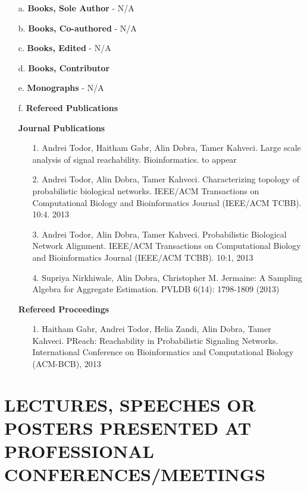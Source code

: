 \documentclass{article}
\begin{document}
\begin{enumerate}
  \renewcommand{\labelenumi}{\alph{enumi}}
  \item[a.] \textbf{Books, Sole Author} - N/A
  \item[b.] \textbf{Books, Co-authored} - N/A
  \item[c.] \textbf{Books, Edited} - N/A
  \item[d.] \textbf{Books, Contributor} 
  \item[e.] \textbf{Monographs} - N/A
  \item[f.] \textbf{Refereed Publications}
    
    \textbf{Journal Publications} 

    \begin{enumerate}
      \renewcommand{\labelenumi}{\arabic{enumii}}
      \item[1.] Andrei Todor, Haitham Gabr, Alin Dobra, Tamer Kahveci. Large scale analysis of signal reachability. Bioinformatics. to appear
      \item[2.] Andrei Todor, Alin Dobra, Tamer Kahveci. Characterizing topology of probabilistic biological networks. IEEE/ACM Transactions on Computational Biology and Bioinformatics Journal (IEEE/ACM TCBB). 10:4. 2013
      \item[3.] Andrei Todor,  Alin Dobra, Tamer Kahveci. Probabilistic Biological Network Alignment. IEEE/ACM Transactions on Computational Biology and Bioinformatics Journal (IEEE/ACM TCBB). 10:1, 2013
      \item[4.] Supriya Nirkhiwale, Alin Dobra, Christopher M. Jermaine: A Sampling Algebra for Aggregate Estimation. PVLDB 6(14): 1798-1809 (2013)
    \end{enumerate}

    \textbf{Refereed Proceedings}
    \begin{enumerate}
      \item[1.] Haitham Gabr, Andrei Todor, Helia Zandi, Alin Dobra, Tamer Kahveci. PReach: Reachability in Probabilistic Signaling Networks. International Conference on Bioinformatics and Computational Biology (ACM-BCB), 2013
    \end{enumerate}
\end{enumerate}

\section{LECTURES, SPEECHES OR POSTERS PRESENTED AT PROFESSIONAL
  CONFERENCES/MEETINGS}
\end{document}
